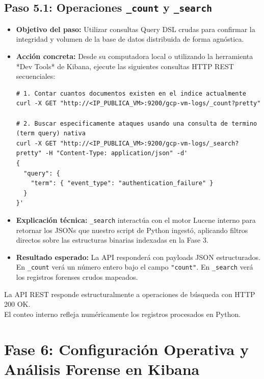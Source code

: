 \documentclass[
  coursetitle={Cómputo Nube y Tecnologías Emergentes},
  coursehours={96},
  coursedate={Verano 2026},
  doctype={Práctica},
  otherlangs={english,french},
  authorname={Lázaro},
  authorsurname={Bustio-Martínez},
  authortitle={PhD},
  role={Profesor Investigador},
  email={lbustio@inaoe.mx},
  phone={5559504000},
  ext={7459},
  institution={Instituto Nacional de Astrofísica, Óptica y Electrónica (INAOE)},
  department={Maestría en Ciencias en Tecnologías de Seguridad},
  address={Luis Enrique Erro 1, Sta. Ma. Tonantzintla, San Andrés Cholula, CP 72840, Puebla, México},
  margin={0.5in}
]{../../lbustio_lecture_notes}
\begin{document}
\subsection{Paso 5.1: Operaciones \texttt{\_count} y \texttt{\_search}}
\begin{itemize}
    \item \textbf{Objetivo del paso:} Utilizar consultas Query DSL crudas para confirmar la integridad y volumen de la base de datos distribuida de forma agnóstica.
    \item \textbf{Acción concreta:} Desde su computadora local o utilizando la herramienta *Dev Tools* de Kibana, ejecute las siguientes consultas HTTP REST secuenciales:
\begin{verbatim}
# 1. Contar cuantos documentos existen en el indice actualmente
curl -X GET "http://<IP_PUBLICA_VM>:9200/gcp-vm-logs/_count?pretty"

# 2. Buscar especificamente ataques usando una consulta de termino (term query) nativa
curl -X GET "http://<IP_PUBLICA_VM>:9200/gcp-vm-logs/_search?pretty" -H "Content-Type: application/json" -d'
{
  "query": {
    "term": { "event_type": "authentication_failure" }
  }
}'
\end{verbatim}
    \item \textbf{Explicación técnica:} \texttt{\_search} interactúa con el motor Lucene interno para retornar los JSONs que nuestro script de Python ingestó, aplicando filtros directos sobre las estructuras binarias indexadas en la Fase 3.
    \item \textbf{Resultado esperado:} La API responderá con payloads JSON estructurados. En \texttt{\_count} verá un número entero bajo el campo \texttt{"count"}. En \texttt{\_search} verá los registros forenses crudos mapeados.
\end{itemize}

\begin{tcolorbox}[colback=green!5!white,colframe=green!60!black,title=\textbf{Checkpoint de Validación 4}]
\checkmark La API REST responde estructuralmente a operaciones de búsqueda con HTTP 200 OK.\\
\checkmark El conteo interno refleja numéricamente los registros procesados en Python.
\end{tcolorbox}

\section{Fase 6: Configuración Operativa y Análisis Forense en Kibana}
\end{document}
